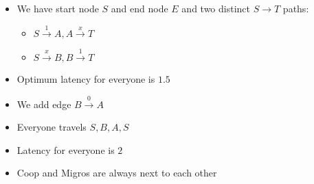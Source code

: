 \begin{itemize}
\begin{itemize}
\begin{itemize}
                    \item We have start node $S$ and end node $E$ and two distinct $S \to T$ paths:
                        \begin{itemize}
                            \item $S \overset{1}{\to} A, A \overset{x}{\to} T$
                            \item $S \overset{x}{\to} B, B \overset{1}{\to} T$
                        \end{itemize}
                     \item Optimum latency for everyone is $1.5$
                     \item We add edge $B \overset{0}{\to} A$
                     \item Everyone travels $S, B, A, S$
                     \item Latency for everyone is $2$
                \end{itemize}
                \begin{itemize}
                    \item Coop and Migros are always next to each other
                \end{itemize}
        \end{itemize}
\end{itemize}
